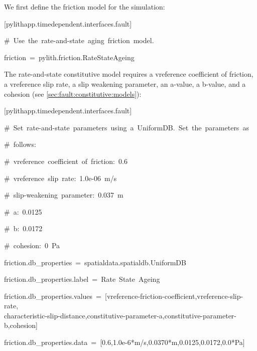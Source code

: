We first define the friction model for the simulation:
\begin{lyxcode}
{[}pylithapp.timedependent.interfaces.fault{]}

\#~Use~the~rate-and-state~aging~friction~model.

friction~=~pylith.friction.RateStateAgeing
\end{lyxcode}
The rate-and-state constitutive model requires a vreference coefficient
of friction, a vreference slip rate, a slip weakening parameter, an
a-value, a b-value, and a cohesion (see \vref{sec:fault:constitutive:models}):
\begin{lyxcode}
{\small{}{[}pylithapp.timedependent.interfaces.fault{]}}{\small \par}

{\small{}\#~Set~rate-and-state~parameters~using~a~UniformDB.~Set~the~parameters~as}{\small \par}

{\small{}\#~follows:}{\small \par}

{\small{}\#~vreference~coefficient~of~friction:~0.6}{\small \par}

{\small{}\#~vreference~slip~rate:~1.0e-06~m/s}{\small \par}

{\small{}\#~slip-weakening~parameter:~0.037~m}{\small \par}

{\small{}\#~a:~0.0125}{\small \par}

{\small{}\#~b:~0.0172}{\small \par}

{\small{}\#~cohesion:~0~Pa}{\small \par}

{\small{}friction.db\_properties~=~spatialdata.spatialdb.UniformDB}{\small \par}

{\small{}friction.db\_properties.label~=~Rate~State~Ageing}{\small \par}

{\small{}friction.db\_properties.values~=~{[}vreference-friction-coefficient,vreference-slip-rate,}~\\
{\small{}characteristic-slip-distance,constitutive-parameter-a,constitutive-parameter-b,cohesion{]}}{\small \par}

{\small{}friction.db\_properties.data~=~{[}0.6,1.0e-6{*}m/s,0.0370{*}m,0.0125,0.0172,0.0{*}Pa{]}}{\small \par}
\end{lyxcode}
